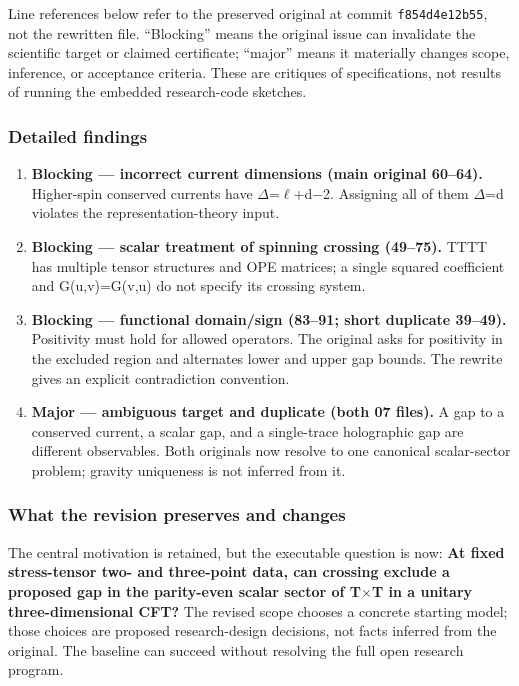 \documentclass[
  11pt,
]{article}
\begin{document}
Line references below refer to the preserved original at commit
\texttt{f854d4e12b55}, not the rewritten file. ``Blocking'' means the
original issue can invalidate the scientific target or claimed
certificate; ``major'' means it materially changes scope, inference, or
acceptance criteria. These are critiques of specifications, not results
of running the embedded research-code sketches.

\subsubsection{Detailed findings}

\begin{enumerate}
\def\labelenumi{\arabic{enumi}.}
\item
  \textbf{Blocking --- incorrect current dimensions (main original
  60--64).} Higher-spin conserved currents have
  \ensuremath{\Delta}=\ensuremath{\ell}+d\ensuremath{-}2. Assigning all
  of them \ensuremath{\Delta}=d violates the representation-theory
  input.
\item
  \textbf{Blocking --- scalar treatment of spinning crossing (49--75).}
  TTTT has multiple tensor structures and OPE matrices; a single squared
  coefficient and G(u,v)=G(v,u) do not specify its crossing system.
\item
  \textbf{Blocking --- functional domain/sign (83--91; short duplicate
  39--49).} Positivity must hold for allowed operators. The original
  asks for positivity in the excluded region and alternates lower and
  upper gap bounds. The rewrite gives an explicit contradiction
  convention.
\item
  \textbf{Major --- ambiguous target and duplicate (both 07 files).} A
  gap to a conserved current, a scalar gap, and a single-trace
  holographic gap are different observables. Both originals now resolve
  to one canonical scalar-sector problem; gravity uniqueness is not
  inferred from it.
\end{enumerate}

\subsubsection{What the revision preserves and changes}

The central motivation is retained, but the executable question is now:
\textbf{At fixed stress-tensor two- and three-point data, can crossing
exclude a proposed gap in the parity-even scalar sector of
T\ensuremath{\times}T in a unitary three-dimensional CFT?} The revised
scope chooses a concrete starting model; those choices are proposed
research-design decisions, not facts inferred from the original. The
baseline can succeed without resolving the full open research program.
\end{document}
